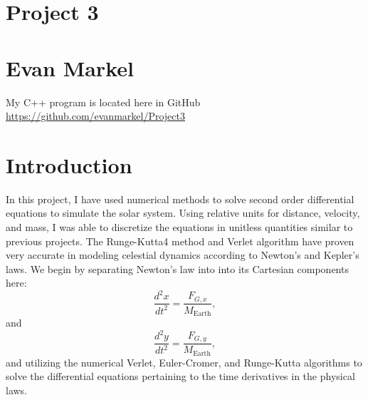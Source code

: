 \documentclass[11pt,a4wide]{article}
\begin{document}
\section*{Project 3}
\section*{Evan Markel}

My C++ program is located here in GitHub \url{https://github.com/evanmarkel/Project3}

\section*{Introduction}
%
In this project, I have used numerical methods to solve second order differential equations to simulate the solar system. Using relative units for distance, velocity, and mass, I was able to discretize the equations in unitless quantities similar to previous projects. The Runge-Kutta4 method and Verlet algorithm have proven very accurate in modeling celestial dynamics according to Newton's and Kepler's laws. We begin by separating Newton's law into into its Cartesian components here: 
\[
\frac{d^2x}{dt^2}=\frac{F_{G,x}}{M_{\mathrm{Earth}}},
\]
and 
\[
\frac{d^2y}{dt^2}=\frac{F_{G,y}}{M_{\mathrm{Earth}}},
\]\newline
and utilizing the numerical Verlet, Euler-Cromer, and Runge-Kutta algorithms to solve the differential equations pertaining to the time derivatives in the physical laws. 
\end{document}
